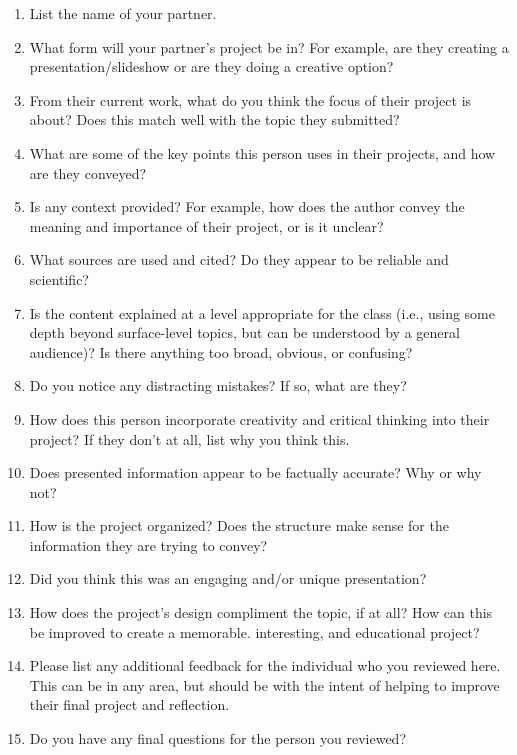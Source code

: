 \documentclass[11pt]{article}%
\begin{document}
\begin{enumerate}
\setcounter{enumi}{0}
    \item List the name of your partner.

    \item What form will your partner's project be in? For example, are they creating a presentation/slideshow or are they doing a creative option?

    \item From their current work, what do you think the focus of their project is about? Does this match well with the topic they submitted?

    \item What are some of the key points this person uses in their projects, and how are they conveyed?

    \item Is any context provided? For example, how does the author convey the meaning and importance of their project, or is it unclear?

    \item What sources are used and cited? Do they appear to be reliable and scientific?

    \item Is the content explained at a level appropriate for the class (i.e., using some depth beyond surface-level topics, but can be understood by a general audience)? Is there anything too broad, obvious, or confusing?

    \item Do you notice any distracting mistakes? If so, what are they? 

    \item How does this person incorporate creativity and critical thinking into their project? If they don't at all, list why you think this.

    \item Does presented information appear to be factually accurate? Why or why not?

    \item How is the project organized? Does the structure make sense for the information they are trying to convey?

    \item Did you think this was an engaging and/or unique presentation? 

    \item How does the project's design compliment the topic, if at all? How can this be improved to create a memorable. interesting, and educational project?

    \item Please list any additional feedback for the individual who you reviewed here. This can be in any area, but should be with the intent of helping to improve their final project and reflection. 

    \item Do you have any final questions for the person you reviewed?

\end{enumerate}
\end{document}
